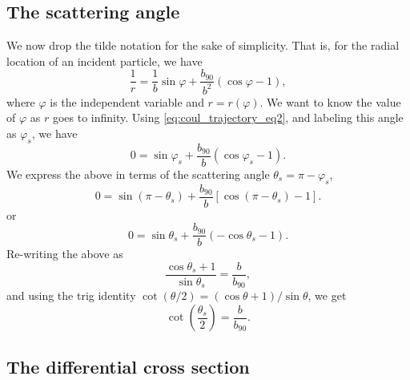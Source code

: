 \documentclass[a4paper,11pt]{report}
\begin{document}
\subsection{The scattering angle}
We now drop the tilde notation for the sake of simplicity. That is, for the radial location of an incident particle, we have
\begin{equation}
    \label{eq:coul_trajectory_eq2}
    \frac{1}{r} = \frac{1}{b} \sin \varphi + \frac{b_{90}}{b^2} \left ( \cos \varphi - 1 \right ),
\end{equation}
where $\varphi$ is the independent variable and $r = r(\varphi)$. We want to know the value of $\varphi$ as $r$ goes to infinity. Using \cref{eq:coul_trajectory_eq2}, and labeling this angle as $\varphi_s$, we have
\begin{equation*}
    0 = \sin \varphi_s + \frac{b_{90}}{b} \left ( \cos \varphi_s - 1 \right ).
\end{equation*}
We express the above in terms of the scattering angle $\theta_s = \pi - \varphi_s$,
\begin{equation*}
    0 = \sin (\pi - \theta_s) + \frac{b_{90}}{b} \left [ \cos \left (\pi - \theta_s \right ) - 1 \right ].
\end{equation*}
or
\begin{equation*}
    0 = \sin \theta_s + \frac{b_{90}}{b} \left ( -\cos \theta_s - 1 \right ).
\end{equation*}
Re-writing the above as
\begin{equation*}
    \frac{\cos \theta_s + 1}{\sin \theta_s} = \frac{b}{b_{90}},
\end{equation*}
and using the trig identity $\cot (\theta/2) = (\cos \theta + 1) / \sin \theta$, we get 
\begin{equation}
    \label{eq:coul_scattering_angle}
    \cot \left ( \frac{ \theta_s }{2} \right ) = \frac{b}{b_{90}}.
\end{equation}

\subsection{The differential cross section}
\end{document}
